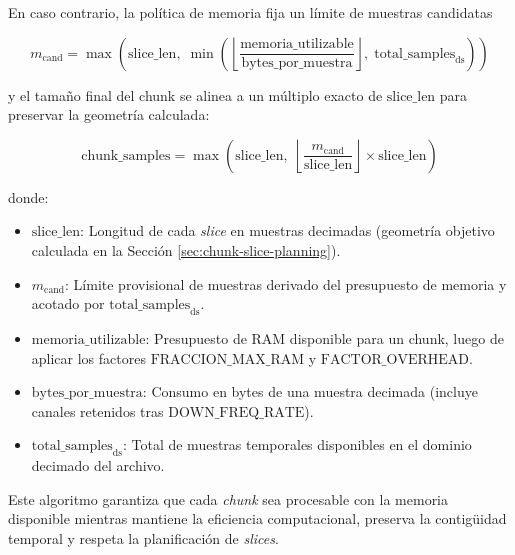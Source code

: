 En caso contrario, la política de memoria fija un límite de muestras candidatas

\[
m_{\text{cand}} = \max\!\left(\text{slice\_len},\; \min\!\left(\left\lfloor \frac{\text{memoria\_utilizable}}{\text{bytes\_por\_muestra}} \right\rfloor,\; \text{total\_samples}_{\mathrm{ds}}\right)\right)
\]

y el tamaño final del chunk se alinea a un múltiplo exacto de $\text{slice\_len}$ para preservar la geometría calculada:

\[
\text{chunk\_samples} = \max\!\left(\text{slice\_len},\; \left\lfloor \frac{m_{\text{cand}}}{\text{slice\_len}} \right\rfloor \times \text{slice\_len} \right)
\]

\noindent donde:
\begin{itemize}
    \item $\text{slice\_len}$: Longitud de cada \emph{slice} en muestras decimadas (geometría objetivo calculada en la Sección \ref{sec:chunk-slice-planning}).
    \item $m_{\text{cand}}$: Límite provisional de muestras derivado del presupuesto de memoria y acotado por $\text{total\_samples}_{\mathrm{ds}}$.
    \item $\text{memoria\_utilizable}$: Presupuesto de RAM disponible para un chunk, luego de aplicar los factores $\text{FRACCION\_MAX\_RAM}$ y $\text{FACTOR\_OVERHEAD}$.
    \item $\text{bytes\_por\_muestra}$: Consumo en bytes de una muestra decimada (incluye canales retenidos tras $\text{DOWN\_FREQ\_RATE}$).
    \item $\text{total\_samples}_{\mathrm{ds}}$: Total de muestras temporales disponibles en el dominio decimado del archivo.
\end{itemize}

Este algoritmo garantiza que cada \emph{chunk} sea procesable con la memoria disponible mientras mantiene la eficiencia computacional, preserva la contigüidad temporal y respeta la planificación de \emph{slices}.

